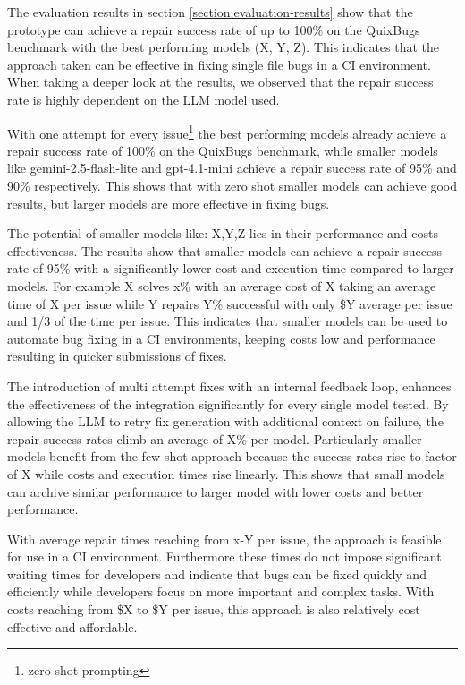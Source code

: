 The evaluation results in section \ref{section:evaluation-results} show that the prototype can achieve a repair success rate of up to 100\% on the QuixBugs benchmark with the best performing models (X, Y, Z). This indicates that the approach taken can be effective in fixing single file bugs in a CI environment. When taking a deeper look at the results, we observed that the repair success rate is highly dependent on the LLM model used.

With one attempt for every issue\footnote{zero shot prompting} the best performing models already achieve a repair success rate of 100\% on the QuixBugs benchmark, while smaller models like gemini-2.5-flash-lite and gpt-4.1-mini achieve a repair success rate of 95\% and 90\% respectively. This shows that with zero shot smaller models can achieve good results, but larger models are more effective in fixing bugs.

The potential of smaller models like: X,Y,Z lies in their performance and costs effectiveness. The results show that smaller models can achieve a repair success rate of 95\% with a significantly lower cost and execution time compared to larger models. For example X solves x\% with an average cost of X taking an average time of X per issue while Y repairs Y\% successful with only \$Y average per issue and 1/3 of the time per issue. This indicates that smaller models can be used to automate bug fixing in a CI environments, keeping costs low and performance resulting in quicker submissions of fixes.

The introduction of multi attempt fixes with an internal feedback loop, enhances the effectiveness of the integration significantly for every single model tested. By allowing the LLM to retry fix generation with additional context on failure, the repair success rates climb an average of X\% per model. Particularly smaller models benefit from the few shot approach because the success rates rise to factor of X while costs and execution times rise linearly. This shows that small models can archive similar performance to larger model with lower costs and better performance.

With average repair times reaching from x-Y per issue, the approach is feasible for use in a CI environment. Furthermore these times do not impose significant waiting times for developers and indicate that bugs can be fixed quickly and efficiently while developers focus on more important and complex tasks. With costs reaching from \$X to \$Y per issue, this approach is also relatively cost effective and affordable.

